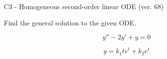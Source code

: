 \begin{exercise}
  \begin{exerciseTitle}C3 - Homogeneous second-order linear ODE (ver. 68)\end{exerciseTitle}
  \begin{exerciseStatement}
    
Find the general solution to the given ODE.

    
\[y''-2y'+y = 0\]

  \end{exerciseStatement}
  \begin{exerciseAnswer}
    
\[y= k_{1} t e^{t} + k_{2} e^{t}\]

  \end{exerciseAnswer}
\end{exercise}